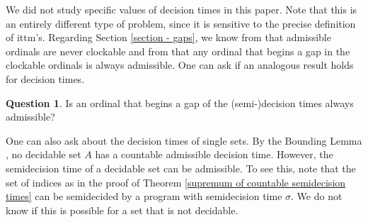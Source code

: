 \documentclass[a4paper,11pt]{amsart}
\theoremstyle{definition}
\newtheorem{question}[fact]{Question}
\newtheorem*{problem A}{Problem 1}
\newtheorem*{problem B}{Problem 2}
\theoremstyle{remark}
\begin{document}

We did not study specific values of decision times in this paper. 
Note that this is an entirely different type of problem, since it is sensitive to the precise definition of ittm's. 
Regarding Section \ref{section - gaps}, we know from \cite[Theorem 8.8]{hamkins2000infinite} that admissible ordinals are never clockable and from \cite[Theorem 50]{welch2009characteristics} that any ordinal that begins a gap in the clockable ordinals is always admissible. 
One can ask if an analogous result holds for decision times. 

\begin{question}
Is an ordinal that begins a gap of the (semi-)decision times always admissible? 
\end{question}

One can also ask about the decision times of single sets. 
By the Bounding Lemma \cite[Theorem 8]{W08}, no decidable set $A$ has a countable admissible decision time. 
However, the semidecision time of a decidable set can be admissible. 
To see this, note that the set of indices as in the proof of Theorem \ref{supremum of countable semidecision times} can be semidecided by a program with semidecision time $\sigma$. 
We do not know if this is possible for a set that is not decidable. 









%
%
 
\end{document}
